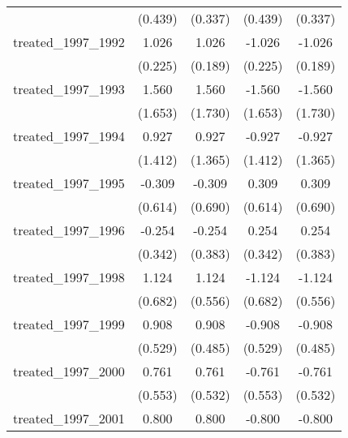 {\begin{tabular}{l*{4}{c}}
            &     (0.439)         &     (0.337)         &     (0.439)         &     (0.337)         \\
[1em]
treated\_1997\_1992&       1.026\sym{***}&       1.026\sym{***}&      -1.026\sym{***}&      -1.026\sym{***}\\
            &     (0.225)         &     (0.189)         &     (0.225)         &     (0.189)         \\
[1em]
treated\_1997\_1993&       1.560         &       1.560         &      -1.560         &      -1.560         \\
            &     (1.653)         &     (1.730)         &     (1.653)         &     (1.730)         \\
[1em]
treated\_1997\_1994&       0.927         &       0.927         &      -0.927         &      -0.927         \\
            &     (1.412)         &     (1.365)         &     (1.412)         &     (1.365)         \\
[1em]
treated\_1997\_1995&      -0.309         &      -0.309         &       0.309         &       0.309         \\
            &     (0.614)         &     (0.690)         &     (0.614)         &     (0.690)         \\
[1em]
treated\_1997\_1996&      -0.254         &      -0.254         &       0.254         &       0.254         \\
            &     (0.342)         &     (0.383)         &     (0.342)         &     (0.383)         \\
[1em]
treated\_1997\_1998&       1.124         &       1.124\sym{*}  &      -1.124         &      -1.124\sym{*}  \\
            &     (0.682)         &     (0.556)         &     (0.682)         &     (0.556)         \\
[1em]
treated\_1997\_1999&       0.908         &       0.908         &      -0.908         &      -0.908         \\
            &     (0.529)         &     (0.485)         &     (0.529)         &     (0.485)         \\
[1em]
treated\_1997\_2000&       0.761         &       0.761         &      -0.761         &      -0.761         \\
            &     (0.553)         &     (0.532)         &     (0.553)         &     (0.532)         \\
[1em]
treated\_1997\_2001&       0.800         &       0.800         &      -0.800         &      -0.800         \\

\end{tabular}}
